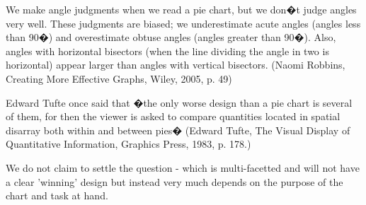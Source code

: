 	
	We make angle judgments when we read a pie chart, but we don�t judge angles very well. These judgments are biased; we underestimate acute angles (angles less than 90�) and overestimate obtuse angles (angles greater than 90�). Also, angles with horizontal bisectors (when the line dividing the angle in two is horizontal) appear larger than angles with vertical bisectors. (Naomi Robbins, Creating More Effective Graphs, Wiley, 2005, p. 49)
	
	 Edward Tufte once said that �the only worse design than a pie chart is several of them, for then the viewer is asked to compare quantities located in spatial disarray both within and between pies� (Edward Tufte, The Visual Display of Quantitative Information, Graphics Press, 1983, p. 178.)

 We do not claim to settle the question - which is multi-facetted and will not have a clear 'winning' design but instead very much depends on the purpose of the chart and task at hand.

